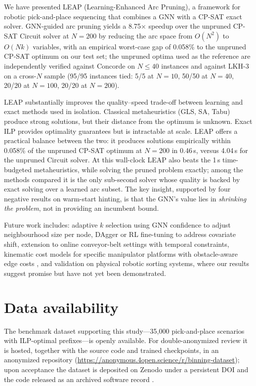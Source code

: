 \documentclass[review,times]{elsarticle}
\begin{document}
We have presented LEAP (Learning-Enhanced Arc Pruning), a framework for robotic pick-and-place sequencing that combines a GNN with a CP-SAT exact solver. GNN-guided arc pruning yields a 8.75$\times$ speedup over the unpruned CP-SAT Circuit solver at $N{=}200$ by reducing the arc space from $O(N^2)$ to $O(Nk)$ variables, with an empirical worst-case gap of 0.058\% to the unpruned CP-SAT optimum on our test set; the unpruned optima used as the reference are independently verified against Concorde \cite{applegate2006concorde} on $N\!\le\!40$ instances and against LKH-3 \cite{helsgaun2000lkh} on a cross-$N$ sample (95/95 instances tied: 5/5 at $N{=}10$, 50/50 at $N{=}40$, 20/20 at $N{=}100$, 20/20 at $N{=}200$).

LEAP substantially improves the quality--speed trade-off between learning and exact methods used in isolation. Classical metaheuristics (GLS, SA, Tabu) produce strong solutions, but their distance from the optimum is unknown. Exact ILP provides optimality guarantees but is intractable at scale. LEAP offers a practical balance between the two: it produces solutions empirically within 0.058\% of the unpruned CP-SAT optimum at $N{=}200$ in 0.46\,s, versus 4.04\,s for the unpruned Circuit solver. At this wall-clock LEAP also beats the 1\,s time-budgeted metaheuristics, while solving the pruned problem exactly; among the methods compared it is the only sub-second solver whose quality is backed by exact solving over a learned arc subset. The key insight, supported by four negative results on warm-start hinting, is that the GNN's value lies in \emph{shrinking the problem}, not in providing an incumbent bound.

Future work includes: adaptive $k$ selection using GNN confidence to adjust neighbourhood size per node, DAgger \cite{ross2011dagger} or RL fine-tuning to address covariate shift, extension to online conveyor-belt settings with temporal constraints, kinematic cost models for specific manipulator platforms \cite{han2020pap} with obstacle-aware edge costs \cite{ojha2026obstacle}, and validation on physical robotic sorting systems, where our results suggest promise but have not yet been demonstrated.


\section*{Data availability}
The benchmark dataset supporting this study---35{,}000 pick-and-place scenarios with ILP-optimal prefixes---is openly available. For double-anonymized review it is hosted, together with the source code and trained checkpoints, in an anonymized repository (\url{https://anonymous.4open.science/r/binning-dataset}); upon acceptance the dataset is deposited on Zenodo under a persistent DOI \cite{binning_dataset_2026} and the code released as an archived software record \cite{leap_software_2026}.
\end{document}
